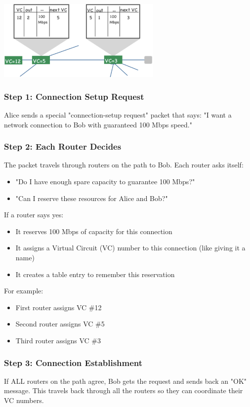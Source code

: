 \documentclass[../../compsys.tex]{subfiles}
\begin{document}
\begin{center}
    \includegraphics[width=0.6\textwidth]{images/vc.png}
\end{center}

\subsubsection{Step 1: Connection Setup Request}
Alice sends a special "connection-setup request" packet that says: "I want a network connection to Bob with guaranteed 100 Mbps speed."

\subsubsection{Step 2: Each Router Decides}
The packet travels through routers on the path to Bob. Each router asks itself:
\begin{itemize}
    \item "Do I have enough spare capacity to guarantee 100 Mbps?"
    \item "Can I reserve these resources for Alice and Bob?"
\end{itemize}

If a router says yes:
\begin{itemize}
    \item It reserves 100 Mbps of capacity for this connection
    \item It assigns a Virtual Circuit (VC) number to this connection (like giving it a name)
    \item It creates a table entry to remember this reservation
\end{itemize}

For example:
\begin{itemize}
    \item First router assigns VC \#12
    \item Second router assigns VC \#5  
    \item Third router assigns VC \#3
\end{itemize}

\subsubsection{Step 3: Connection Establishment}
If ALL routers on the path agree, Bob gets the request and sends back an "OK" message. This travels back through all the routers so they can coordinate their VC numbers.
\end{document}
